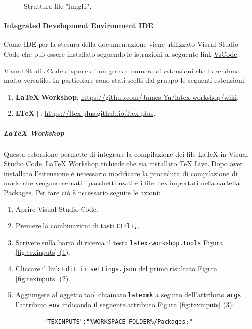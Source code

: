 \begin{figure}[H]
    \caption{Struttura file "lunghi".}
    \label{fig:struttura_file_lungi}
\end{figure}


\paragraph{Integrated Development Environment IDE}
\label{par:IDE}
Come IDE per la stesura della documentazione viene utilizzato Visual Studio Code che può essere installato seguendo le istruzioni al seguente link \href{https://code.visualstudio.com/docs/setup/windows}{VsCode}.

Visual Studio Code dispone di un grande numero di estensioni che lo rendono molto versatile.
In particolare sono stati scelti dal gruppo le seguenti estensioni:
\begin{enumerate}
    \item \textbf{LaTeX Workshop}: \href{https://github.com/James-Yu/latex-workshop/wiki}{https://github.com/James-Yu/latex-workshop/wiki}.
    \item \textbf{LTeX+}: \href{ https://ltex-plus.github.io/ltex-plus}{ https://ltex-plus.github.io/ltex-plus}.
\end{enumerate}

\subparagraph{LaTeX Workshop}
Questa estensione permette di integrare la compilazione dei file LaTeX in Visual Studio Code.
LaTeX Workshop richiede che sia installato TeX Live.
Dopo aver installato l'estensione è necessario modificare la procedura di compilazione di modo che vengano cercati i pacchetti usati e i file .tex importati nella cartella Packages.
Per fare ciò è necessario seguire le azioni:
\begin{enumerate}
    \item Aprire Visual Studio Code.
    
    \item Premere la combinazioni di tasti \texttt{Ctrl+,}.
    
    \item Scrivere sulla barra di ricerca il testo \texttt{latex-workshop.tools} \hyperref[fig:texinputs]{Figura \ref{fig:texinputs} (1)}.
    
    \item Cliccare il link \texttt{Edit in settings.json} del primo risultato \hyperref[fig:texinputs]{Figura \ref{fig:texinputs} (2)}.
    
    \item Aggiungere al oggetto tool chiamato \texttt{latexmk} a seguito dell'attributo \texttt{args} l'attributo \texttt{env} indicando il seguente attributo \hyperref[fig:texinputs]{Figura \ref{fig:texinputs} (3)}: 
    \begin{lstlisting}
        "TEXINPUTS":"%WORKSPACE_FOLDER%/Packages;"
    \end{lstlisting}
\end{enumerate}

